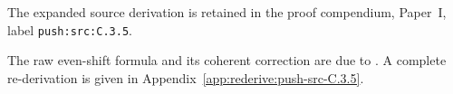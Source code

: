 The expanded source derivation is retained in the proof compendium, Paper~I, label \nolinkurl{push:src:C.3.5}.




The raw even-shift formula and its coherent correction are due to \citet[Proposition~7.8, pp.~91--92, and Proposition~C.2, p.~102]{DuEtAl2026v1}. A complete re-derivation is given in Appendix~\ref{app:rederive:push-src-C.3.5}.



